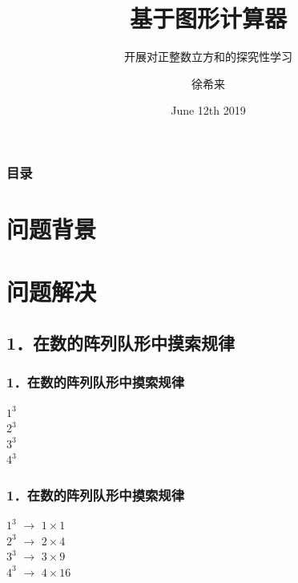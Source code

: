 \documentclass[aspectratio=169]{beamer}
\title{基于图形计算器}
\subtitle{开展对正整数立方和的探究性学习}
\author{徐希来}
\date{June 12th 2019}
\begin{document}
 
\frame{\titlepage}

 \begin{frame}
 \frametitle{目录}
 \begin{multicols}{2}
 	\tableofcontents%
 \end{multicols}

\end{frame}

\section{问题背景}

\section{问题解决}

\subsection{1．在数的阵列队形中摸索规律}
      \begin{frame}
     \frametitle{1．在数的阵列队形中摸索规律}
     \colorbox{green!70!yellow}{$ 1^3 $}  
     \\ \vspace{1em}
     \colorbox{green!70!blue}{$ 2^3 $}    
     \\ \vspace{1em}
     \colorbox{green!50!blue}{$ 3^3 $}     
     \\  \vspace{1em}
     \colorbox{green!50!black}{$ 4^3 $}    
     \\
     \end{frame}

      \begin{frame}
     \frametitle{1．在数的阵列队形中摸索规律}
     \colorbox{green!70!yellow}{$ 1^3 $}   $ \longrightarrow $   \colorbox{green!70!yellow}{$ 1 \times 1 $}  
     \\ \vspace{1em}
     \colorbox{green!70!blue}{$ 2^3 $}    $ \longrightarrow $   \colorbox{green!70!blue}{$ 2 \times 4 $}   
     \\ \vspace{1em}
     \colorbox{green!50!blue}{$ 3^3 $}     $ \longrightarrow $   \colorbox{green!50!blue}{$ 3 \times 9 $}   
     \\  \vspace{1em}
     \colorbox{green!50!black}{$ 4^3 $}    $ \longrightarrow $  \colorbox{green!50!black}{$ 4 \times 16 $}  
     \\
     
 \end{frame}
\end{document}
